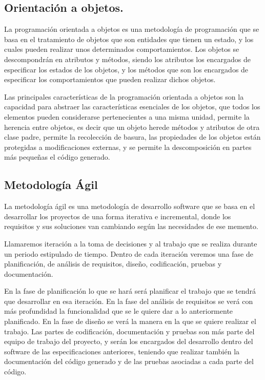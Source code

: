 \subsection{Orientación a objetos.}
La programación orientada a objetos es una metodología de programación que se basa en el tratamiento de objetos que son entidades que tienen un estado, y los cuales pueden realizar unos determinados comportamientos.
Los objetos se descompondrán en atributos y métodos, siendo los atributos los encargados de especificar los estados de los objetos, y los métodos que son los encargados de especificar los comportamientos que pueden realizar dichos objetos.

Las principales características de la programación orientada a objetos son la capacidad para abstraer las características esenciales de los objetos, que todos los elementos pueden considerarse pertenecientes a una misma unidad, permite la herencia entre objetos, es decir que un objeto herede métodos y atributos de otra clase padre, permite la recolección de basura, las propiedades de los objetos están protegidas a modificaciones externas, y se permite la descomposición en partes más pequeñas el código generado.


\subsection{Metodología Ágil}

La metodología ágil es una metodología de desarrollo software que se basa en el desarrollar los proyectos de una forma iterativa e incremental, donde los requisitos y sus soluciones van cambiando según las necesidades de ese memento.

Llamaremos iteración a la toma de decisiones y al trabajo que se realiza durante un periodo estipulado de tiempo. Dentro de cada iteración veremos una fase de planificación, de análisis de requisitos, diseño, codificación, pruebas y documentación.

En la fase de planificación lo que se hará será planificar el trabajo que se tendrá que desarrollar en esa iteración. En la fase del análisis de requisitos se verá con más profundidad la funcionalidad que se le quiere dar a lo anteriormente planificado. En la fase de diseño se verá la manera en la que se quiere realizar el trabajo. Las partes de codificación, documentación y pruebas son más parte del equipo de trabajo del proyecto, y serán los encargados del desarrollo dentro del software de las especificaciones anteriores, teniendo que realizar también la documentación del código generado y de las pruebas asociadas a cada parte del código.



